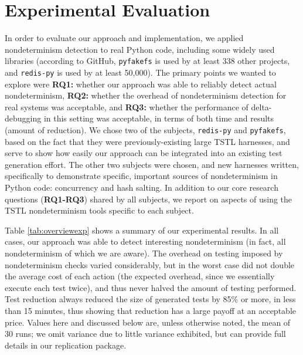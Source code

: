 \section{Experimental Evaluation}

In order to evaluate our approach and implementation, we applied
nondeterminism detection to real Python code, including some widely
used libraries (according to GitHub, {\tt pyfakefs} is used by at least
338 other projects, and {\tt redis-py} is used by at least 50,000).  The primary
points we wanted to explore were {\bf RQ1:} whether our approach was able to reliably detect actual
nondeterminism, {\bf RQ2:} whether the overhead of nondeterminism
detection for real systems was acceptable, and {\bf RQ3:} whether the performance of
delta-debugging in this setting was acceptable, in terms of both time
and results (amount of reduction).  We chose two of
the subjects, {\tt redis-py} and {\tt pyfakefs}, based on the fact that they were previously-existing large
TSTL harnesses, and serve to show how easily our
approach can be integrated into an existing test
generation effort.  The other two subjects were chosen, and new harnesses
written, specifically to demonstrate specific, important sources of
nondeterminism in Python code: concurrency and hash salting.  In
addition to our core research questions ({\bf RQ1-RQ3}) shared by all subjects, we
report on aspects of using the TSTL nondeterminism tools
specific to each subject.

Table \ref{tab:overviewexp} shows a summary of our experimental
results.  In all cases, our approach was able to detect interesting
nondeterminism (in fact, all nondeterminism of which we are aware).  The overhead on testing imposed by nondeterminism
checks varied considerably, but in the worst case did not double the
average cost of each action (the expected overhead, since we
essentially execute each test twice), and thus never halved the amount of
testing performed.  Test reduction always reduced the size of
generated tests by 85\% or more, in less than 15 minutes, thus showing that reduction
has a large payoff at an acceptable price.  Values here and discussed
below are, unless otherwise noted, the mean of 30 runs; we omit variance due to little
variance exhibited, but can provide full details in our replication package.

